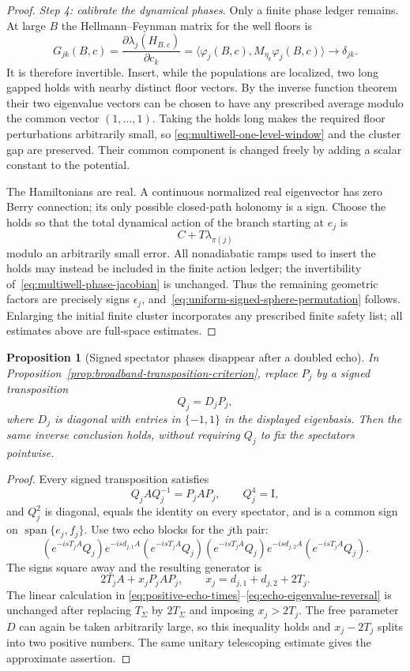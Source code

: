 \documentclass[11pt]{article}
\newtheorem{proposition}[theorem]{Proposition}
\theoremstyle{remark}
\newcommand{\Id}{\mathrm I}
\begin{document}
\begin{proof}
\emph{Step 4: calibrate the dynamical phases.}
Only a finite phase ledger remains.  At large $B$ the Hellmann--Feynman
matrix for the well floors is
\[
 G_{jk}(B,c)=
 \frac{\partial\lambda_j(H_{B,c})}{\partial c_k}
 =\langle\varphi_j(B,c),M_{\eta_k}\varphi_j(B,c)\rangle
 \longrightarrow\delta_{jk}.
 \label{eq:multiwell-phase-jacobian}
\]
It is therefore invertible.  Insert, while the populations are localized,
two long gapped holds with nearby distinct floor vectors.  By the inverse
function theorem their two eigenvalue vectors can be chosen to have any
prescribed average modulo the common vector $(1,\ldots,1)$.  Taking the
holds long makes the required floor perturbations arbitrarily small, so
\eqref{eq:multiwell-one-level-window} and the cluster gap are preserved.
Their common component is changed freely by adding a scalar constant to
the potential.

The Hamiltonians are real.  A continuous normalized real eigenvector has
zero Berry connection; its only possible closed-path holonomy is a sign.
Choose the holds so that the total dynamical action of the branch starting
at $e_j$ is
\[
 C+T\lambda_{\pi(j)}
\]
modulo an arbitrarily small error.  All nonadiabatic ramps used to insert
the holds may instead be included in the finite action ledger; the
invertibility of~\eqref{eq:multiwell-phase-jacobian} is unchanged.
Thus the remaining geometric factors are precisely signs $\epsilon_j$,
and~\eqref{eq:uniform-signed-sphere-permutation} follows.  Enlarging the
initial finite cluster incorporates any prescribed finite safety list;
all estimates above are full-space estimates.
\end{proof}

\begin{proposition}[Signed spectator phases disappear after a doubled echo]
\label{prop:signed-permutation-doubled-echo}
In Proposition~\ref{prop:broadband-transposition-criterion}, replace $P_j$
by a signed transposition
\[
 Q_j=D_jP_j,
\]
where $D_j$ is diagonal with entries in $\{-1,1\}$ in the displayed
eigenbasis.  Then the same inverse conclusion holds, without requiring
$Q_j$ to fix the spectators pointwise.
\end{proposition}

\begin{proof}
Every signed transposition satisfies
\[
 Q_jA Q_j^{-1}=P_jAP_j,\qquad Q_j^4=\Id,
\]
and $Q_j^2$ is diagonal, equals the identity on every spectator, and is a
common sign on $\operatorname{span}\{e_j,f_j\}$.  Use two echo blocks for
the $j$th pair:
\[
 (e^{-isT_jA}Q_j)e^{-isd_{j,1}A}(e^{-isT_jA}Q_j)
 (e^{-isT_jA}Q_j)e^{-isd_{j,2}A}(e^{-isT_jA}Q_j).
\]
The signs square away and the resulting generator is
\[
 2T_jA+x_jP_jAP_j,\qquad
 x_j=d_{j,1}+d_{j,2}+2T_j.
\]
The linear calculation in
\eqref{eq:positive-echo-times}--\eqref{eq:echo-eigenvalue-reversal}
is unchanged after replacing $T_\Sigma$ by $2T_\Sigma$ and imposing
$x_j>2T_j$.  The free parameter $D$ can again be taken arbitrarily large,
so this inequality holds and $x_j-2T_j$ splits into two positive numbers.
The same unitary telescoping estimate gives the approximate assertion.
\end{proof}
\end{document}
